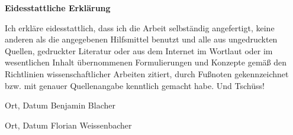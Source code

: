 \textbf{\Large Eidesstattliche Erklärung}

Ich erkläre eidesstattlich, dass ich die Arbeit selbständig angefertigt, keine anderen als die angegebenen Hilfsmittel benutzt und alle aus ungedruckten Quellen, gedruckter Literatur oder aus dem Internet im Wortlaut oder im wesentlichen Inhalt übernommenen Formulierungen und Konzepte gemäß den Richtlinien wissenschaftlicher Arbeiten zitiert, durch Fußnoten gekennzeichnet bzw. mit genauer Quellenangabe kenntlich gemacht habe. Und Tschüss!

\vspace{2cm}
\hspace{2cm}\hrulefill{}\hspace{2.35cm}\hrulefill{}\hspace{1cm}

\hspace{2cm} Ort, Datum \hspace{5cm} Benjamin Blacher \hfill

\vspace{2cm}
\hspace{2cm}\hrulefill{}\hspace{2.35cm}\hrulefill{}\hspace{1cm}

\hspace{2cm} Ort, Datum \hspace{5cm} Florian Weissenbacher \hfill